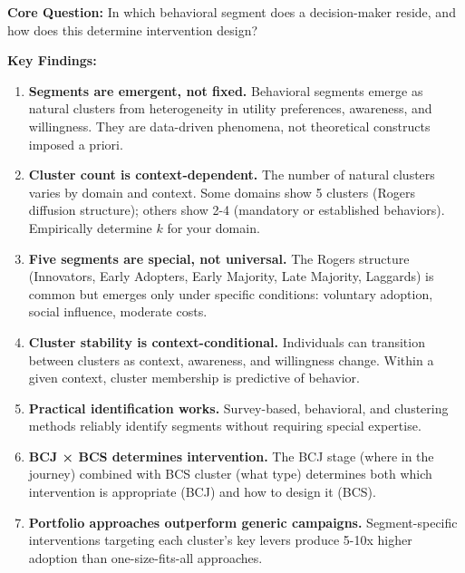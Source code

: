 \begin{tcolorbox}[colback=green!10!white, colframe=green!75!black,
    title=\textbf{Chapter 14: Summary}]

\textbf{Core Question:} In which behavioral segment does a decision-maker reside, and
how does this determine intervention design?

\textbf{Key Findings:}

\begin{enumerate}

\item \textbf{Segments are emergent, not fixed.} Behavioral segments emerge as natural
clusters from heterogeneity in utility preferences, awareness, and willingness. They
are data-driven phenomena, not theoretical constructs imposed a priori.

\item \textbf{Cluster count is context-dependent.} The number of natural clusters varies
by domain and context. Some domains show 5 clusters (Rogers diffusion structure); others
show 2-4 (mandatory or established behaviors). Empirically determine $k$ for your domain.

\item \textbf{Five segments are special, not universal.} The Rogers structure (Innovators,
Early Adopters, Early Majority, Late Majority, Laggards) is common but emerges only under
specific conditions: voluntary adoption, social influence, moderate costs.

\item \textbf{Cluster stability is context-conditional.} Individuals can transition
between clusters as context, awareness, and willingness change. Within a given context,
cluster membership is predictive of behavior.

\item \textbf{Practical identification works.} Survey-based, behavioral, and clustering
methods reliably identify segments without requiring special expertise.

\item \textbf{BCJ × BCS determines intervention.} The BCJ stage (where in the journey)
combined with BCS cluster (what type) determines both which intervention is appropriate
(BCJ) and how to design it (BCS).

\item \textbf{Portfolio approaches outperform generic campaigns.} Segment-specific
interventions targeting each cluster's key levers produce 5-10x higher adoption than
one-size-fits-all approaches.


\end{enumerate}
\end{tcolorbox}
